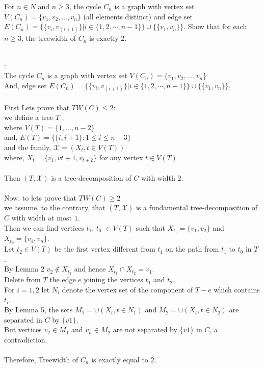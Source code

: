 \documentclass[11pt]{exam}
\begin{document}
\begin{questions}
\question For $n \in N$ and $n \geq 3$, the cycle $C_n$ is a graph with vertex set $V(C_n ) = \{v_1 , v_2 , ... , v_n \}$ (all elements distinct) and edge set $E(C_n ) = \{\{v_i , v_(i+1) \} | i \in \{1, 2, ⋯ , n − 1\}\} \cup \{\{v_1 , v_n \}\}$. Show that for each $n \geq 3$, the treewidth of $C_n$ is exactly $2$.
\begin{solution}\\
    :\\The cycle $C_n$ is a graph with vertex set $V(C_n ) = \{v_1 , v_2 , ... , v_n \}$\\
    And, edge set $E(C_n ) = \{\{v_i , v_(i+1) \} | i \in \{1, 2, ⋯ , n − 1\}\} \cup \{\{v_1 , v_n \}\}$.\\\\
    First Lets prove that \hspace{1cm}$TW(C)\leq 2$:\\
    we define a tree $T$ , \\
    where\hspace{3.4cm} $V (T ) = \{1, . . . , n-2\}$\\
    and, \hspace{3.6cm} $E(T ) = \{\{i,i+1\} : 1 \leq i \leq n-3\}$\\
    and the family, \hspace{1.9cm}$\mathcal{X} = (X_t, t \in V (T))$\\
    where, \hspace{3.2cm} $X_t = \{v_1, vt+1, v_{t+2}\}$ \hspace{1cm}for any vertex $t \in V(T)$\\\\
    Then $(T, \mathcal{X})$ is a tree-decomposition of $C$ with width $2$.\\\\
    Now, to lets prove that $TW(C) \geq 2$\\
    we assume, to the contrary, that $(T, \mathcal{X})$ is a fundamental tree-decomposition of $C$ with width at most $1$.\\
    Then we can find vertices $t_1$, $t_0$ $\in V(T)$ such that $X_{t_1} = \{v_1, v_2\}$ and $X_{t_0} = \{v_1, v_n\}$. \\
    Let $t_2 \in V(T)$ be the first vertex different from $t_1$ on the path from $t_1$ to $t_0$ in $T$ .\\
    By Lemma 2 $v_2 \not\in X_{t_2}$ and hence $X_{t_1} \cap X_{t_2} = {v_1}$.\\
    Delete from $T$ the edge $e$ joining the vertices $t_1$ and $t_2$.\\
    For $i = 1, 2$ let $N_i$ denote the vertex set of the component of $T-e$ which contains $t_i$. \\
    By Lemma 5, the sets $M_1 = \cup(X_t,t \in N_1)$ and $M_2 = \cup(X_t,t \in N_2)$ are separated in $C$ by $\{v1\}$.\\
    But vertices $v_2 \in M_1$ and $v_n \in M_2$ are not separated by $\{v1\}$ in $C$, a contradiction.\\\\
    Therefore, Treewidth of $C_n$ is exactly equal to 2.
    

\end{solution}
\end{questions}
\end{document}
